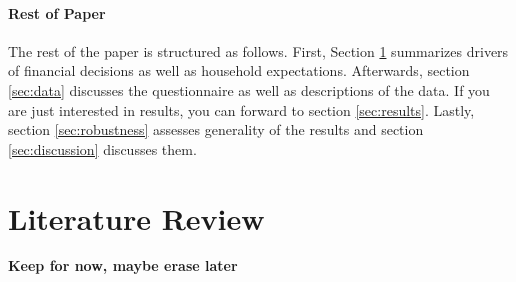 \documentclass[ProjectABM]{subfiles}
\begin{document}


\paragraph{Rest of Paper}
The rest of the paper is structured as follows. First, Section \ref{sec:literature} summarizes drivers of financial decisions as well as household expectations. Afterwards, section \ref{sec:data} discusses the questionnaire as well as descriptions of the data. If you are just interested in results, you can forward to section \ref{sec:results}. Lastly, section \ref{sec:robustness} assesses generality of the results and section \ref{sec:discussion} discusses them.


\section{Literature Review}\label{sec:literature}
\textbf{Keep for now, maybe erase later}
\end{document}

